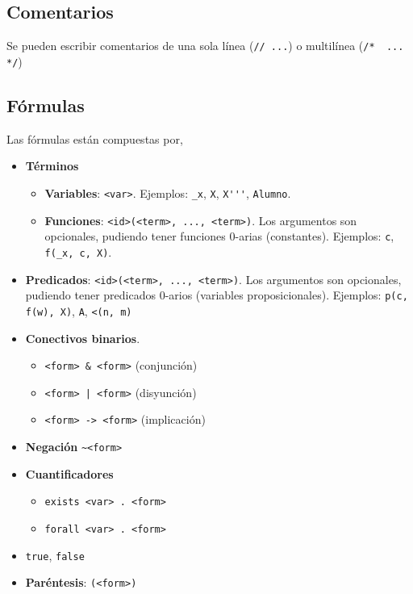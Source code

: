 \subsection{Comentarios}

Se pueden escribir comentarios de una sola línea (\lstinline{// ...}) o multilínea
(\lstinline{/*  ... */})

\subsection{Fórmulas}

Las fórmulas están compuestas por,

\begin{itemize}
    \item \textbf{Términos}
    \begin{itemize}
        \item \textbf{Variables}: \lstinline{<var>}. Ejemplos: \lstinline{_x},
        \lstinline{X}, \lstinline{X'''}, \lstinline{Alumno}.
        \item \textbf{Funciones}: \lstinline{<id>(<term>, ..., <term>)}. Los
        argumentos son opcionales, pudiendo tener funciones 0-arias
        (constantes). Ejemplos:  \lstinline{c}, \lstinline{f(_x, c, X)}.
    \end{itemize}
    \item \textbf{Predicados}: \lstinline{<id>(<term>, ..., <term>)}. Los
    argumentos son opcionales, pudiendo tener predicados 0-arios (variables
    proposicionales). Ejemplos: \lstinline{p(c, f(w), X)}, \lstinline{A},
    \lstinline{<(n, m)}
    \item \textbf{Conectivos binarios}.
    \begin{itemize}
        \item \lstinline{<form> & <form>} (conjunción)
        \item \lstinline{<form> | <form>} (disyunción)
        \item \lstinline{<form> -> <form>} (implicación)
    \end{itemize}
    \item \textbf{Negación} \lstinline{~<form>}
    \item \textbf{Cuantificadores}
    \begin{itemize}
        \item \lstinline{exists <var> . <form>}
        \item \lstinline{forall <var> . <form>}
    \end{itemize}
    \item \lstinline{true}, \lstinline{false}
    \item \textbf{Paréntesis}: \lstinline{(<form>)}
\end{itemize}


